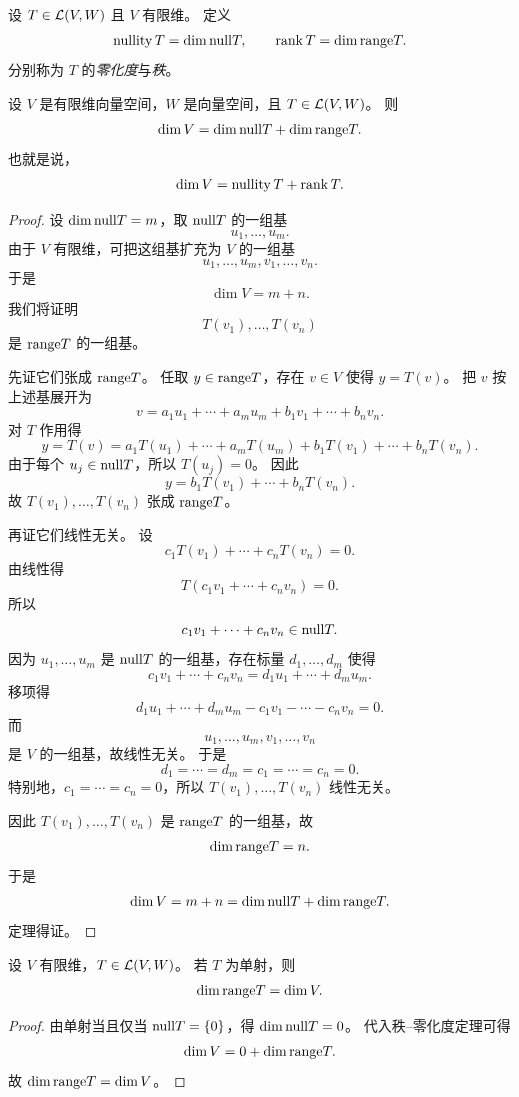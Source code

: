 \begin{definition} 设 $T\in\mathcal{L}(V,W)$ 且 $V$ 有限维。 定义 \[ \operatorname{nullity} T=\dim \mathrm{null} T, \qquad
\operatorname{rank} T=\dim \mathrm{range} T. \] 分别称为 $T$ 的\emph{零化度}与\emph{秩}。 \end{definition}

\begin{theorem}[秩--零化度定理] 设 $V$ 是有限维向量空间，$W$ 是向量空间，且 $T\in\mathcal{L}(V,W)$。 则 \[ \dim V=\dim
\mathrm{null} T+\dim \mathrm{range} T. \] 也就是说， \[ \dim V=\operatorname{nullity} T+\operatorname{rank} T. \] \end{theorem}

\begin{proof} 设 $\dim \mathrm{null} T=m$，取 $\mathrm{null} T$ 的一组基 \[ u_1,\dots,u_m. \] 由于 $V$ 有限维，可把这组基扩充为
$V$ 的一组基 \[ u_1,\dots,u_m,v_1,\dots,v_n. \] 于是 \[ \dim V=m+n. \] 我们将证明 \[
T(v_1),\dots,T(v_n) \] 是 $\mathrm{range} T$ 的一组基。

先证它们张成 $\mathrm{range} T$。 任取 $y\in\mathrm{range} T$，存在 $v\in V$ 使得 $y=T(v)$。 把 $v$ 按上述基展开为 \[
v=a_1u_1+\cdots+a_mu_m+b_1v_1+\cdots+b_nv_n. \] 对 $T$ 作用得 \[
y=T(v)=a_1T(u_1)+\cdots+a_mT(u_m)+b_1T(v_1)+\cdots+b_nT(v_n). \] 由于每个 $u_j\in\mathrm{null} T$，所以
$T(u_j)=0$。 因此 \[ y=b_1T(v_1)+\cdots+b_nT(v_n). \] 故 $T(v_1),\dots,T(v_n)$ 张成 $\mathrm{range}
T$。

再证它们线性无关。 设 \[ c_1T(v_1)+\cdots+c_nT(v_n)=0. \] 由线性得 \[ T(c_1v_1+\cdots+c_nv_n)=0. \] 所以
\[ c_1v_1+\cdots+c_nv_n\in\mathrm{null} T. \] 因为 $u_1,\dots,u_m$ 是 $\mathrm{null} T$ 的一组基，存在标量
$d_1,\dots,d_m$ 使得 \[ c_1v_1+\cdots+c_nv_n=d_1u_1+\cdots+d_mu_m. \] 移项得 \[
d_1u_1+\cdots+d_mu_m-c_1v_1-\cdots-c_nv_n=0. \] 而 \[ u_1,\dots,u_m,v_1,\dots,v_n \] 是
$V$ 的一组基，故线性无关。 于是 \[ d_1=\cdots=d_m=c_1=\cdots=c_n=0. \] 特别地，$c_1=\cdots=c_n=0$，所以
$T(v_1),\dots,T(v_n)$ 线性无关。

因此 $T(v_1),\dots,T(v_n)$ 是 $\mathrm{range} T$ 的一组基，故 \[ \dim \mathrm{range} T=n. \] 于是 \[ \dim
V=m+n=\dim \mathrm{null} T+\dim \mathrm{range} T. \] 定理得证。 \end{proof}

\begin{corollary} 设 $V$ 有限维，$T\in\mathcal{L}(V,W)$。 若 $T$ 为单射，则 \[ \dim \mathrm{range} T=\dim V. \]
\end{corollary}

\begin{proof} 由单射当且仅当 $\mathrm{null} T=\{0\}$，得 $\dim \mathrm{null} T=0$。 代入秩--零化度定理可得 \[ \dim V=0+\dim
\mathrm{range} T. \] 故 $\dim \mathrm{range} T=\dim V$。 \end{proof}

